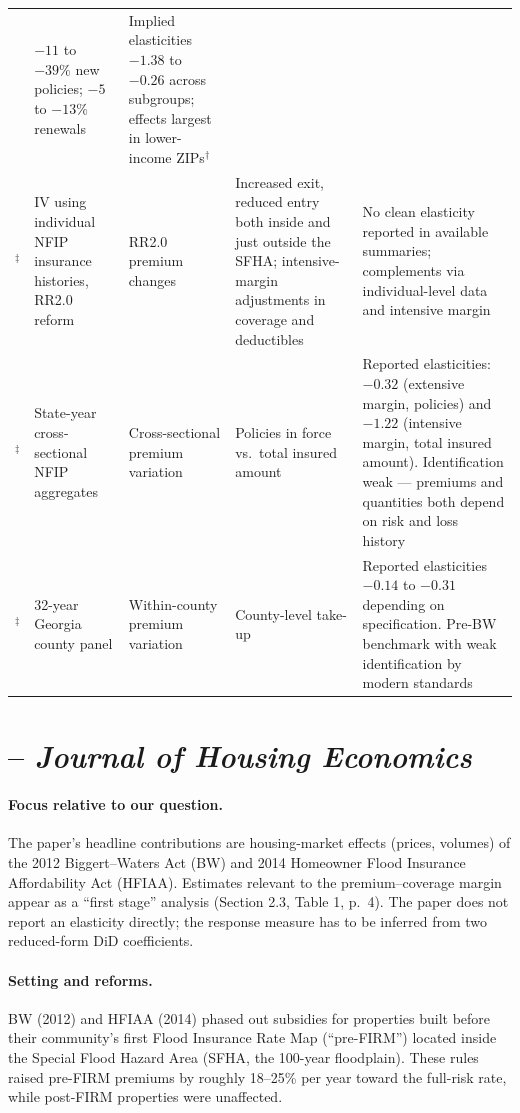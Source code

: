 \documentclass[11pt]{article}
\begin{document}
\begin{landscape}
\begin{tabular}{p{3cm} p{4.5cm} p{3.5cm} p{3.5cm} p{6cm}}
& $-11$ to $-39\%$ new policies; $-5$ to $-13\%$ renewals
& Implied elasticities $-1.38$ to $-0.26$ across subgroups; effects largest in lower-income ZIPs$^\dagger$ \\
\citet{ortega2025}$^\ddagger$
& IV using individual NFIP insurance histories, RR2.0 reform
& RR2.0 premium changes
& Increased exit, reduced entry both inside and just outside the SFHA; intensive-margin adjustments in coverage and deductibles
& No clean elasticity reported in available summaries; complements \citet{gourevitch2025} via individual-level data and intensive margin \\
\citet{browne2000}$^\ddagger$
& State-year cross-sectional NFIP aggregates
& Cross-sectional premium variation
& Policies in force vs.\ total insured amount
& Reported elasticities: $-0.32$ (extensive margin, policies) and $-1.22$ (intensive margin, total insured amount). Identification weak --- premiums and quantities both depend on risk and loss history \\
\citet{atreya2015}$^\ddagger$
& 32-year Georgia county panel
& Within-county premium variation
& County-level take-up
& Reported elasticities $-0.14$ to $-0.31$ depending on specification. Pre-BW benchmark with weak identification by modern standards \\
\bottomrule
\end{tabular}
\end{landscape}

\clearpage

\section{\citet{hennighausen2023} -- \textit{Journal of Housing Economics}}

\paragraph{Focus relative to our question.}
The paper's headline contributions are housing-market effects (prices, volumes) of the
2012 Biggert--Waters Act (BW) and 2014 Homeowner Flood Insurance Affordability Act
(HFIAA). Estimates relevant to the premium--coverage margin appear as a ``first stage''
analysis (Section 2.3, Table 1, p.\ 4). The paper does not report an elasticity directly;
the response measure has to be inferred from two reduced-form DiD coefficients.

\paragraph{Setting and reforms.}
BW (2012) and HFIAA (2014) phased out subsidies for properties built before their
community's first Flood Insurance Rate Map (``pre-FIRM'') located inside the Special
Flood Hazard Area (SFHA, the 100-year floodplain). These rules raised pre-FIRM premiums
by roughly 18--25\% per year toward the full-risk rate, while post-FIRM properties were
unaffected.
\end{document}
